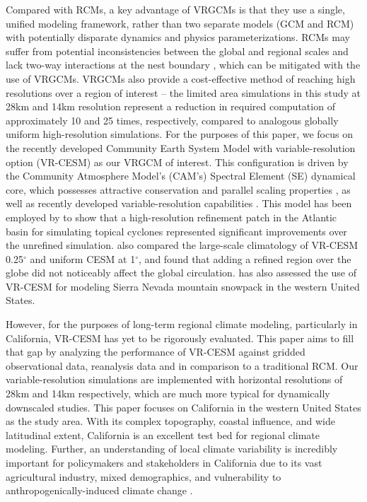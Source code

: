 \documentclass[draft,ms]{agutex}   %
\begin{document}
\begin{article}
Compared with RCMs, a key advantage of VRGCMs is that they use a single, unified modeling framework, rather than two separate models (GCM and RCM) with potentially disparate dynamics and physics parameterizations. RCMs may suffer from potential inconsistencies between the global and regional scales and lack two-way interactions at the nest boundary \citep{warner1997tutorial, mcdonald2003transparent, laprise2008challenging, mesinger2013limited}, which can be mitigated with the use of VRGCMs. VRGCMs also provide a cost-effective method of reaching high resolutions over a region of interest -- the limited area simulations in this study at 28km and 14km resolution represent a reduction in required computation of approximately 10 and 25 times, respectively, compared to analogous globally uniform high-resolution simulations. For the purposes of this paper, we focus on the recently developed Community Earth System Model with variable-resolution option (VR-CESM) as our VRGCM of interest. This configuration is driven by the Community Atmosphere Model's (CAM's) Spectral Element (SE) dynamical core, which possesses attractive conservation and parallel scaling properties \citep{dennis2011cam, taylor2011conservation}, as well as recently developed variable-resolution capabilities \citep{zarzycki2014aquaplanet}. This model has been employed by \cite{zarzycki2014using} to show that a high-resolution refinement patch in the Atlantic basin for simulating topical cyclones represented significant improvements over the unrefined simulation. \cite{zarzycki2015effects} also compared the large-scale climatology of VR-CESM 0.25$^\circ$ and uniform CESM at 1$^\circ$, and found that adding a refined region over the globe did not noticeably affect the global circulation. \cite{Rhoades2015Characterizing} has also assessed the use of VR-CESM for modeling Sierra Nevada mountain snowpack in the western United States.


However, for the purposes of long-term regional climate modeling, particularly in California, VR-CESM has yet to be rigorously evaluated. This paper aims to fill that gap by analyzing the performance of VR-CESM against gridded observational data, reanalysis data and in comparison to a traditional RCM.  Our variable-resolution simulations are implemented with horizontal resolutions of 28km and 14km respectively, which are much more typical for dynamically downscaled studies. This paper focuses on California in the western United States as the study area. With its complex topography, coastal influence, and wide latitudinal extent, California is an excellent test bed for regional climate modeling. Further, an understanding of local climate variability is incredibly important for policymakers and stakeholders in California due to its vast agricultural industry, mixed demographics, and vulnerability to anthropogenically-induced climate change \citep{hayhoe2004emissions, cayan2008overview}. 



\end{article}
\end{document}
